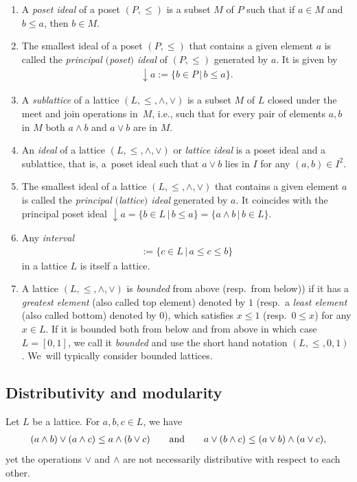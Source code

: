 \documentclass[pdftex]{sigma}
\numberwithin{equation}{section}
\begin{document}
\begin{Definition} \label{de:latticenotion}\qquad\samepage
\begin{enumerate}\itemsep=0pt
\item[$(a)$]
A {\it poset ideal} of a poset $(P,\leq)$ is a subset $M$ of $P$ such that if $a\in M$ and $b\leq a$, then $b\in M$. 	
\item[$(b)$] The smallest ideal of a poset $(P,\leq)$ that contains a given element $a$ is called the {\it principal $($poset$)$ ideal} of $(P,\leq)$ generated by $a$. It is given by
	\begin{gather*}%
\downarrow a:=\{b\in P\,|\, b\leq a\}.
	\end{gather*}
\item[$(c)$]
	A {\it sublattice} of a lattice $(L,\leq, \wedge,\vee)$ is
a subset $M$ of $ L$ closed under the meet and join operations in~$M$, i.e., such that for every pair of elements $a, b$ in $M$ both $a \wedge b$ and $a\vee b$ are in $M$.
\item[$(d)$]
An {\it ideal} of a lattice $(L, \leq,\wedge,\vee)$ or {\it lattice ideal} is a poset ideal and a sublattice, that is, a~poset ideal such that $a\vee b$ lies in $I$ for any $(a, b)\in I^2$.
\item[$(e)$]
The smallest ideal of a lattice $(L, \leq,\wedge,\vee)$ that contains a given element $a$ is called the {\it principal $($lattice$)$ ideal} generated by $a$. It coincides with the principal poset ideal $\downarrow a=\{b\in L\,|\, b\leq a\}=\{a\wedge b\,|\, b\in L \}$.
\item[$(f)$]
Any {\it interval}
\begin{gather*}
[a, b]:=\{c\in L\,|\, a\leq c\leq b \}
\end{gather*} in a lattice $L$ is itself a lattice.
\item[$(g)$]
	A lattice $(L,\leq,\wedge, \vee)$ is {\it bounded} from above (resp.~from below)) if it has a {\it greatest element} (also called top element)
	denoted by $1$ (resp.~a {\it least element} (also called bottom) denoted by $0$), which satisfies $ x\leq 1$ (resp.~$0\leq x$) for any $x\in L$.
	If it is bounded both from below and from above in which case $L=[0, 1]$, we call it {\it bounded} and use the short hand notation $(L, \leq, 0, 1)$. We~will typically consider bounded lattices.
\end{enumerate}
\end{Definition}

\subsection{Distributivity and modularity}
 Let $L$ be a lattice. For $a, b, c\in L$, we have
 \begin{gather*}%
 (a\wedge b)\vee (a\wedge c)\leq a\wedge (b\vee c) \qquad {\rm and}\qquad a\vee (b\wedge c)\leq (a\vee b)\wedge(a\vee c),
 \end{gather*}
 yet the operations $\vee$ and $\wedge$ are not necessarily distributive with respect to each other.
\end{document}
